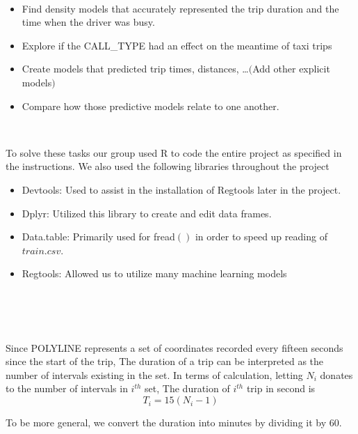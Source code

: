 \documentclass[11pt]{article}
\begin{document}
\\
\begin{itemize}
	\item Find density models that accurately represented the trip duration and the time when the driver was busy.
	\item Explore if the CALL\_TYPE had an effect on the meantime of taxi trips
	\item Create models that predicted trip times, distances, …$($Add other explicit models$)$
	\item Compare how those predictive models relate to one another.
\end{itemize}

\\
\par To solve these tasks our group used R to code the entire project as specified in the instructions.
 We also used the following libraries throughout the project

\begin{itemize}
	\item Devtools: Used to assist in the installation of Regtools later in the project.
	\item Dplyr: Utilized this library to create and edit data frames.
	\item Data.table: Primarily used for fread$()$ in order to speed up reading of \(train.csv\).
	\item Regtools: Allowed us to utilize many machine learning models
\end{itemize}

\\ \\
\\
\par
Since POLYLINE represents a set of coordinates recorded every fifteen seconds since the start of the trip,
 The duration of a trip can be interpreted as the number of intervals existing in the set. In terms of calculation,
 letting $N_i$ donates to the number of intervals in $i^{th}$ set, The duration of $i^{th}$ trip in second is
\begin{equation}
T_i = 15(N_i -1)
\end{equation}
\par
To be more general, we convert the duration into minutes by dividing it by 60.
\end{document}
